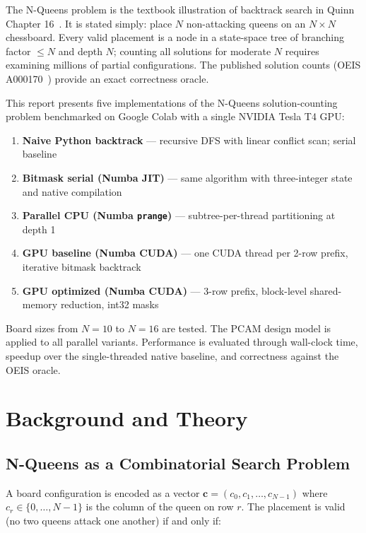 \documentclass[12pt, letterpaper]{article}
\begin{document}
The N-Queens problem is the textbook illustration of backtrack search in Quinn Chapter 16~\cite{quinn2004}. It is stated simply: place $N$ non-attacking queens on an $N \times N$ chessboard. Every valid placement is a node in a state-space tree of branching factor $\leq N$ and depth $N$; counting all solutions for moderate $N$ requires examining millions of partial configurations. The published solution counts (OEIS A000170~\cite{oeisA000170}) provide an exact correctness oracle.

This report presents five implementations of the N-Queens solution-counting problem benchmarked on Google Colab with a single NVIDIA Tesla T4 GPU:

\begin{enumerate}
    \item \textbf{Naive Python backtrack} --- recursive DFS with linear conflict scan; serial baseline
    \item \textbf{Bitmask serial (Numba JIT)} --- same algorithm with three-integer state and native compilation
    \item \textbf{Parallel CPU (Numba \texttt{prange})} --- subtree-per-thread partitioning at depth 1
    \item \textbf{GPU baseline (Numba CUDA)} --- one CUDA thread per 2-row prefix, iterative bitmask backtrack
    \item \textbf{GPU optimized (Numba CUDA)} --- 3-row prefix, block-level shared-memory reduction, int32 masks
\end{enumerate}

Board sizes from $N = 10$ to $N = 16$ are tested. The PCAM design model is applied to all parallel variants. Performance is evaluated through wall-clock time, speedup over the single-threaded native baseline, and correctness against the OEIS oracle.

\section{Background and Theory}
\label{sec:theory}

\subsection{N-Queens as a Combinatorial Search Problem}

A board configuration is encoded as a vector $\mathbf{c} = (c_0, c_1, \ldots, c_{N-1})$ where $c_r \in \{0, \ldots, N-1\}$ is the column of the queen on row $r$. The placement is valid (no two queens attack one another) if and only if:
\end{document}
